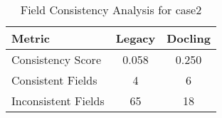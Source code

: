 \begin{table}[h]
\centering
\begin{tabular}{l|cc}
\hline
Metric & Legacy & Docling \\
\hline
Consistency Score & 0.058 & 0.250 \\
Consistent Fields & 4 & 6 \\
Inconsistent Fields & 65 & 18 \\
\hline
\end{tabular}
\caption{Field Consistency Analysis for case2}
\end{table}
